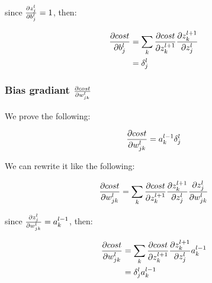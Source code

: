 \documentclass[a4paper]{article}
\begin{document}
since $\frac{\partial z_{j}^{l}}{\partial b_{j}^{l}} = 1$, then:

\begin{align}
  \frac{\partial cost}{\partial b_{j}^{l}} &=
    \sum_{k}{
      \frac{\partial cost}{\partial z_{k}^{l+1}}
      \frac{\partial z_{k}^{l+1}}{\partial z_{j}^{l}}
    } \\
    &= \delta_{j}^{l}
\end{align}

\subsubsection{Bias gradiant $\frac{\partial cost}{\partial w_{jk}^{l}}$}

We prove the following:

\begin{align}
  \frac{\partial cost}{\partial w_{jk}^{l}} = a_{k}^{l-1} \delta_{j}^{l}
\end{align}

We can rewrite it like the following:

\begin{align}
  \frac{\partial cost}{\partial w_{jk}^{l}} =
    \sum_{k}{
      \frac{\partial cost}{\partial z_{k}^{l+1}}
      \frac{\partial z_{k}^{l+1}}{\partial z_{j}^{l}}
      \frac{\partial z_{j}^{l}}{\partial w_{jk}^{l}}
    }
\end{align}

since $\frac{\partial z_{j}^{l}}{\partial w_{jk}^{l}} = a_{k}^{l-1}$, then:

\begin{align}
  \frac{\partial cost}{\partial w_{jk}^{l}} &=
    \sum_{k}{
      \frac{\partial cost}{\partial z_{k}^{l+1}}
      \frac{\partial z_{k}^{l+1}}{\partial z_{j}^{l}}
      a_{k}^{l-1}
    } \\
    &= \delta_{j}^{l} a_{k}^{l-1}
\end{align}
\end{document}
